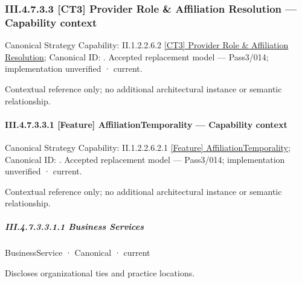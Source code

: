 \subsubsection*{III.4.7.3.3 [CT3] Provider Role \& Affiliation Resolution — Capability context}
\label{navigation:III.4.7.3.3}

{\small Canonical Strategy Capability: II.1.2.2.6.2 \hyperref[element:dd0d16f6e6b9491c85deea915bb7bf4d]{[CT3] Provider Role \& Affiliation Resolution}; Canonical ID: \texttt{}. Accepted replacement model — Pass3/014; implementation unverified · current.}\par
Contextual reference only; no additional architectural instance or semantic relationship.\par
\paragraph*{III.4.7.3.3.1 [Feature] AffiliationTemporality — Capability context}
\label{navigation:III.4.7.3.3.1}

{\small Canonical Strategy Capability: II.1.2.2.6.2.1 \hyperref[element:6beab7cbd7ec4563a82112445a0ffe46]{[Feature] AffiliationTemporality}; Canonical ID: \texttt{}. Accepted replacement model — Pass3/014; implementation unverified · current.}\par
Contextual reference only; no additional architectural instance or semantic relationship.\par
\subparagraph*{III.4.7.3.3.1.1 Business Services}
\label{navigation:III.4.7.3.3.1.1}

\label{navigation:III.4.7.3.3.1.1.1}

\label{element:65baca2a21f040d49be74fab1727f96d}
{\small BusinessService · Canonical · current}\par

Discloses organizational ties and practice locations.


